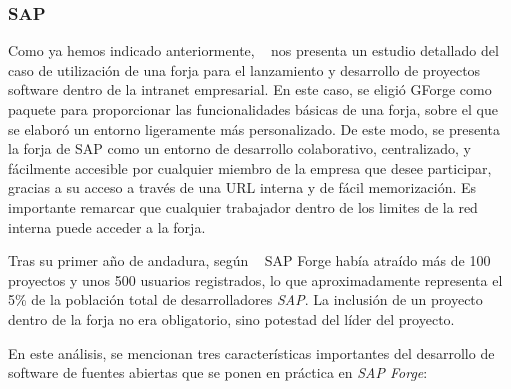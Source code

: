 \subsubsection{SAP}
\label{subsub:sap}

\par Como ya hemos indicado anteriormente, ~\cite{open-collaboration-forges} nos presenta un estudio detallado del caso de utilización de una forja para el lanzamiento y desarrollo de proyectos software dentro de la intranet empresarial. En este caso, se eligió GForge como paquete para proporcionar las funcionalidades básicas de una forja, sobre el que se elaboró un entorno ligeramente más personalizado. De este modo, se presenta la forja de SAP como un entorno de desarrollo colaborativo, centralizado, y fácilmente accesible por cualquier miembro de la empresa que desee participar, gracias a su acceso a través de una URL interna y de fácil memorización. Es importante remarcar que cualquier trabajador dentro de los limites de la red interna puede acceder a la forja.

\par Tras su primer año de andadura, según ~\cite{open-collaboration-forges} SAP Forge había atraído más de 100 proyectos y unos 500 usuarios registrados, lo que aproximadamente representa el 5\% de la población total de desarrolladores \emph{SAP}. La inclusión de un proyecto dentro de la forja no era obligatorio, sino potestad del líder del proyecto.

\par En este análisis, se mencionan tres características importantes del desarrollo de software de fuentes abiertas que se ponen en práctica en \emph{SAP Forge}:

